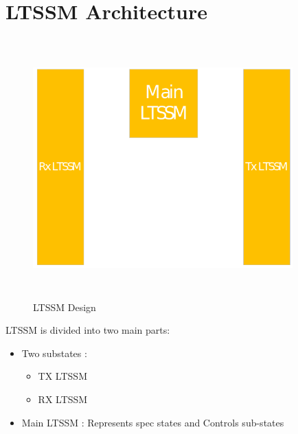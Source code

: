   \section{LTSSM Architecture}
\begin{figure}[H]
  \centering
  \includegraphics[width=100mm,height=100mm]{images/arch2.png}
  \caption{LTSSM Design}
    \label{fig:arch}
  \end{figure}
  LTSSM is divided into two main parts:
    \begin{itemize}
      \item Two substates :
      \begin{itemize}
        \item TX LTSSM
        \item RX LTSSM
      \end{itemize}  
      \item Main LTSSM : Represents spec states and Controls sub-states
    \end{itemize}
    
